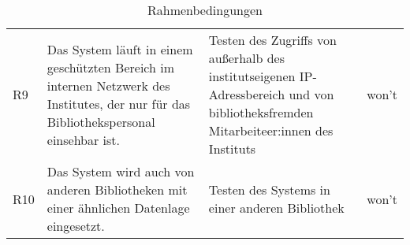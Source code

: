 \begin{table}[h]
\begin{adjustbox}{max width=\textwidth}
\begin{tabular}{lp{6.5cm}p{6.5cm}l}
        R9                                &Das System läuft in einem geschützten Bereich im internen Netzwerk des Institutes, der nur für das Bibliothekspersonal einsehbar ist. & Testen des Zugriffs von außerhalb des institutseigenen IP-Adressbereich und von bibliotheksfremden Mitarbeiteer:innen des Instituts& won't\\
        R10                              &Das System wird auch von anderen Bibliotheken mit einer ähnlichen Datenlage eingesetzt. & Testen des Systems in einer anderen Bibliothek & won't\\
       \bottomrule
    \end{tabular}
    \end{adjustbox}
    \caption{%
        Rahmenbedingungen
    }
    \label{tab:Rahmenbedingungen}
    \end{table}
\endgroup







